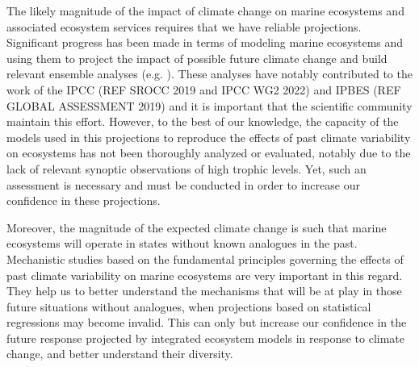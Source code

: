 The likely magnitude of the impact of climate change on marine ecosystems and associated ecosystem services requires that we have reliable projections. Significant progress has been made in terms of modeling marine ecosystems and using them to project the impact of possible future climate change and build relevant ensemble analyses (e.g. \citealp{lotzeGlobalEnsembleProjections2019, tittensorNextgenerationEnsembleProjections2021}). These analyses have notably contributed to the work of the IPCC (REF SROCC 2019 and IPCC WG2 2022) and IPBES (REF GLOBAL ASSESSMENT 2019) and it is important that the scientific community maintain this effort. However, to the best of our knowledge, the capacity of the models used in this projections to reproduce the effects of past climate variability on ecosystems has not been thoroughly analyzed or evaluated, notably due to the lack of relevant synoptic observations of high trophic levels. Yet, such an assessment is necessary and must be conducted in order to increase our confidence in these projections.

Moreover, the magnitude of the expected climate change is such that marine ecosystems will operate in states without known analogues in the past. Mechanistic studies based on the fundamental principles governing the effects of past climate variability on marine ecosystems are very important in this regard. They help us to better understand the mechanisms that will be at play in those future situations without analogues, when projections based on statistical regressions may become invalid. This can only but increase our confidence in the future response projected by integrated ecosystem models in response to climate change, and better understand their diversity.
